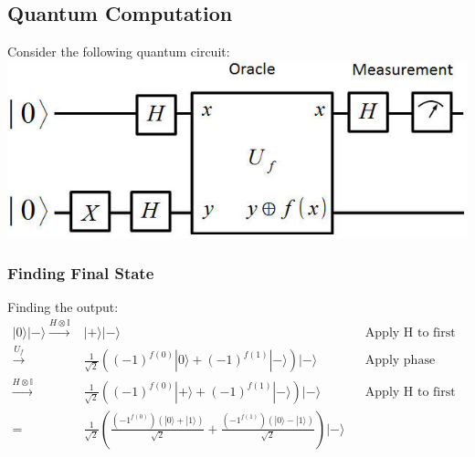 \documentclass{article}
\begin{document}
\subsection{Quantum Computation}
Consider the following quantum circuit:\\
\includegraphics[scale=0.5]{The-Deutsch-Algorithm.jpg}

\subsubsection{Finding Final State}
Finding the output: \\
\begin{align*}
	|0\rangle|-\rangle \xrightarrow{H \otimes \mathbb{I}} & |+\rangle|-\rangle                                                                                                                                  &  & \text{Apply H to first register} \\
	\xrightarrow{U_f}                                     & \frac{1}{\sqrt{2}} ((-1)^{f(0)}|0\rangle + (-1)^{f(1)}|-\rangle) |-\rangle                                                                          &  & \text{Apply phase kickback}      \\
	\xrightarrow{H \otimes \mathbb{I}}                    & \frac{1}{\sqrt{2}} ((-1)^{f(0)}|+\rangle + (-1)^{f(1)}|-\rangle) |-\rangle                                                                          &  & \text{Apply H to first register} \\
	=                                                     & \frac{1}{\sqrt{2}} \left( \frac{(-1^{f(0)})(|0\rangle + |1\rangle)}{\sqrt{2}} + \frac{(-1^{f(1)})(|0\rangle - |1\rangle)}{\sqrt{2}}\right)|-\rangle                                       \\
\end{align*}
\end{document}
